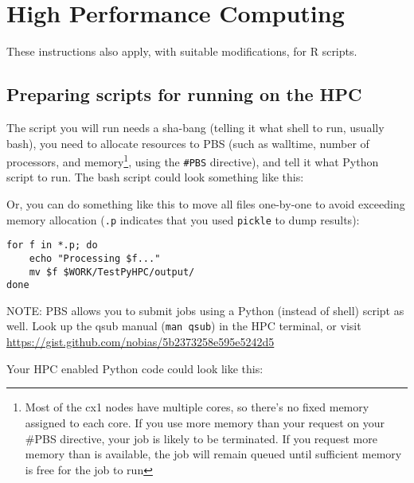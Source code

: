 \chapter{High Performance Computing}
\label{chap:HPC}

These instructions also apply, with suitable modifications, for R 
scripts.

\section{Preparing scripts for running on the HPC}

The script you will run needs a sha-bang (telling it what shell to run, 
usually bash), you need to allocate resources to PBS (such as walltime, 
number of processors, and memory\footnote{Most of the cx1 nodes have 
multiple cores, so there's no fixed memory assigned to each core. If 
you use more memory than your request on your \#PBS directive, your job 
is likely to be terminated. If you request more memory than is 
available, the job will remain queued until sufficient memory is free 
for the job to run}, using the {\tt \#PBS} directive), and tell it what 
Python script to run. The bash script could look something like this:



Or, you can do something like this to move all files one-by-one to 
avoid exceeding memory allocation ({\tt *.p} indicates that you used 
{\tt pickle} to dump results):

\begin{lstlisting}
for f in *.p; do
	echo "Processing $f..."
	mv $f $WORK/TestPyHPC/output/
done
\end{lstlisting}

NOTE: PBS  allows  you  to  submit jobs using a Python (instead of 
shell) script as well. Look up the qsub manual ({\tt man qsub}) in the 
HPC terminal, or visit 
\url{https://gist.github.com/nobias/5b2373258e595e5242d5}

Your HPC enabled Python code could look like this:





